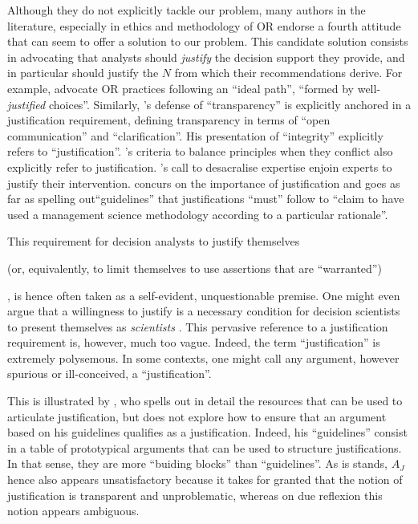 \documentclass[preprint, french, english, 11pt, authoryear]{elsarticle}%
\newcommand{\ac}[1]{#1}
\begin{document}
\begin{changebar}
Although they do not explicitly tackle our problem, many authors in the literature, especially in ethics and methodology of \ac{OR}
endorse a fourth attitude that can seem to offer a solution to our problem. This candidate solution consists in advocating that analysts should \emph{justify} the decision support they provide, and in particular should justify the $N$ from which their recommendations derive.
For example, \citet{lahtinen_why_2017} advocate \ac{OR} practices following an ``ideal path'', ``formed by well-\emph{justified} choices''.
Similarly, \citet{diekmann_moral_2013}'s defense of ``transparency'' is explicitly anchored in a justification requirement, defining transparency in terms of ``open communication'' and ``clarification''. His presentation of ``integrity'' explicitly refers to ``justification''.
 \citet{beauchamp_principles_2009}'s criteria to balance principles when they conflict also explicitly refer to justification.
\citet{white_death_1994}'s call to desacralise expertise enjoin experts to justify their intervention.
\citet{jackson_towards_1999} concurs on the importance of justification and goes as far as spelling out``guidelines'' that justifications ``must'' follow to “claim to have used a management science methodology according to a particular rationale''.
\end{changebar}

This requirement for decision analysts to justify themselves
\begin{changebar}(or, equivalently, to limit themselves to use assertions that are ``warranted'')\end{changebar}, is hence often taken as a self-evident, unquestionable premise. 
One might even argue that a willingness to justify is a necessary condition for decision scientists to present themselves as \emph{scientists} \citep{ormerod_justifying_2010}. 
This pervasive reference to a justification requirement is, however, much too vague. Indeed, the term ``justification'' is extremely polysemous. 
In some contexts, one might call any argument, however spurious or ill-conceived, a ``justification''.


\begin{changebar}This is illustrated by \citet{jackson_towards_1999}, who spells out in detail the resources that can be used to articulate justification, but does not explore how to ensure that an argument based on his guidelines qualifies as a justification.
Indeed, his ``guidelines'' consist in a table of prototypical arguments that can be used to structure justifications. In that sense, they are more ``buiding blocks'' than ``guidelines''. 
As is stands, $A_J$ hence also appears unsatisfactory because it takes for granted that the notion of justification is transparent and unproblematic, whereas on due reflexion this notion appears ambiguous.
\end{changebar}
\end{document}
